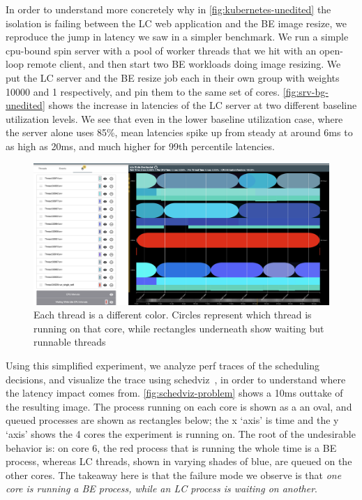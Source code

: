 In order to understand more concretely why in \autoref{fig:kubernetes-unedited}
the isolation is failing between the LC web application and the BE image resize,
we reproduce the jump in latency we saw in a simpler benchmark. We run a simple
cpu-bound spin server with a pool of worker threads that we hit with an
open-loop remote client, and then start two BE workloads doing image resizing.
We put the LC server and the BE resize job each in their own \cgroups{} group
with weights 10000 and 1 respectively, and pin them to the same set of cores.
\autoref{fig:srv-bg-unedited} shows the increase in latencies of the LC server
at two different baseline utilization levels. We see that even in the lower
baseline utilization case, where the server alone uses 85\%, mean latencies
spike up from steady at around 6ms to as high as 20ms, and much higher for 99th
percentile latencies.

\begin{figure}[t]
    \centering
    \includegraphics[width=\columnwidth]{graphs/schedviz-problem.png}
    \caption{Each thread is a different color. Circles represent which
    thread is running on that core, while rectangles underneath show waiting but
    runnable threads
    }\label{fig:schedviz-problem}
\end{figure}

Using this simplified experiment, we analyze perf traces of the scheduling
decisions, and visualize the trace using schedviz~\cite{schedviz-tool}, in order
to understand where the latency impact comes from.
\autoref{fig:schedviz-problem} shows a 10ms outtake of the resulting image. The
process running on each core is shown as a an oval, and queued processes are
shown as rectangles below; the x `axis' is time and the y `axis' shows the 4
cores the experiment is running on. The root of the undesirable behavior is: on
core 6, the red process that is running the whole time is a BE process, whereas
LC threads, shown in varying shades of blue, are queued on the other cores. The
takeaway here is that the failure mode we observe is that \textit{one core is
running a BE process, while an LC process is waiting on another}.

